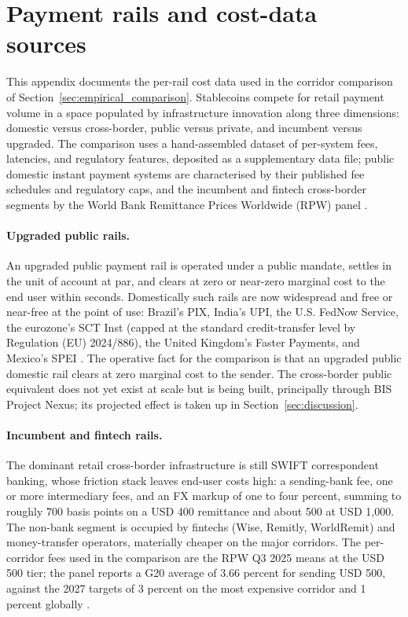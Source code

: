 \section{Payment rails and cost-data sources}\label{app:cost_data}\label{sec:landscape}

This appendix documents the per-rail cost data used in the corridor comparison of Section~\ref{sec:empirical_comparison}. Stablecoins compete for retail payment volume in a space populated by infrastructure innovation along three dimensions: domestic versus cross-border, public versus private, and incumbent versus upgraded. The comparison uses a hand-assembled dataset of per-system fees, latencies, and regulatory features, deposited as a supplementary data file; public domestic instant payment systems are characterised by their published fee schedules and regulatory caps, and the incumbent and fintech cross-border segments by the World Bank Remittance Prices Worldwide (RPW) panel \citep{rpw_q3_2025,beck_martinez_peria_2011}.

\paragraph{Upgraded public rails.} An upgraded public payment rail is operated under a public mandate, settles in the unit of account at par, and clears at zero or near-zero marginal cost to the end user within seconds. Domestically such rails are now widespread and free or near-free at the point of use: Brazil's PIX, India's UPI, the U.S. FedNow Service, the eurozone's SCT Inst (capped at the standard credit-transfer level by Regulation (EU) 2024/886), the United Kingdom's Faster Payments, and Mexico's SPEI \citep{frost_etal_2024_fast_payments,duarte_etal_2022_pix}. The operative fact for the comparison is that an upgraded public domestic rail clears at zero marginal cost to the sender. The cross-border public equivalent does not yet exist at scale but is being built, principally through BIS Project Nexus; its projected effect is taken up in Section~\ref{sec:discussion}.

\paragraph{Incumbent and fintech rails.} The dominant retail cross-border infrastructure is still SWIFT correspondent banking, whose friction stack \citep{cpmi_2018_cross_border_retail} leaves end-user costs high: a sending-bank fee, one or more intermediary fees, and an FX markup of one to four percent, summing to roughly 700 basis points on a USD 400 remittance and about 500 at USD 1{,}000. The non-bank segment is occupied by fintechs (Wise, Remitly, WorldRemit) and money-transfer operators, materially cheaper on the major corridors. The per-corridor fees used in the comparison are the RPW Q3 2025 means at the USD 500 tier; the panel reports a G20 average of 3.66 percent for sending USD 500, against the 2027 targets of 3 percent on the most expensive corridor and 1 percent globally \citep{rpw_q3_2025}.

